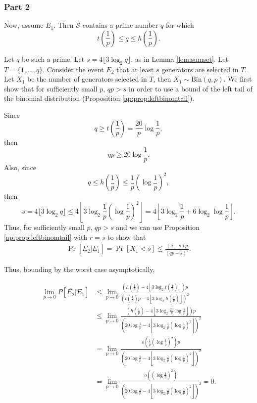 \subsubsection*{Part 2}

Now, assume $E_1$. Then $\mathcal{S}$ contains a prime number $q$ for which 
\[t\left(\frac{1}{p}\right) \leq q \leq h\left(\frac{1}{p}\right).\]
\par Let $q$ be such a prime. Let $s = 4\lfloor3\log_2 q \rfloor$, as in Lemma \ref{lem:sumset}. Let $T = \{1, \ldots,  q\}$. Consider the event $E_2$ that at least $s$ generators are selected in $T$. Let $X_1$ be the number of generators selected in $T$, then $X_1 \sim \mathrm{Bin}(q, p)$. We first show that for sufficiently small $p$, $qp > s$ in order to use a bound of the left tail of the binomial distribution (Proposition \ref{ap:prop:leftbinomtail}). \par
Since 
\[q \geq t\left(\frac{1}{p}\right) = \frac{20}{p}\log\frac{1}{p},\]
then 
\begin{equation*}
qp \geq 20\log\frac{1}{p}.
\end{equation*}
Also, since 
\[q \leq h\left(\frac{1}{p}\right) \leq \frac{1}{p}\left(\log\frac{1}{p}\right)^2,\]
then
\[s = 4\lfloor3\log_2 q \rfloor \leq 4\left\lfloor3\log_2 \frac{1}{p}\left(\log\frac{1}{p}\right)^2 \right\rfloor = 4\left\lfloor3\log_2 \frac{1}{p} + 6\log_2 \log\frac{1}{p} \right\rfloor.\]
Thus, for sufficiently small $p$, $qp> s$ and we can use Proposition \ref{ap:prop:leftbinomtail} with $r = s$ to show that
\begin{align*}
    \Pr[ \overline{E_2}  | E_1] = \Pr\left[X_1 < s\right] \leq \frac{(q - s)p}{(qp - s)^2}.
\end{align*}
\par Thus, bounding by the worst case asymptotically, 

\begin{align*}
    \lim_{p \to 0} P[\overline{E_2} | E_1] &\leq \lim_{p \to 0}\frac{\left(h\left(\frac{1}{p}\right) - 4\left\lfloor3\log_2 t\left(\frac{1}{p}\right) \right\rfloor\right)p}{\left(t\left(\frac{1}{p}\right)p - 4\left\lfloor3\log_2 h\left(\frac{1}{p}\right) \right\rfloor\right)^2} \\
    &\leq \lim_{p \to 0}\frac{\left(h\left(\frac{1}{p}\right) - 4\left\lfloor3\log_2 \frac{20}{p}\log\frac{1}{p} \right\rfloor\right)p}{\left(20\log\frac{1}{p} - 4\left\lfloor3\log_2 \frac{1}{p}\left(\log\frac{1}{p}\right)^2 \right\rfloor\right)^2}\\
    &=\lim_{p \to 0} \frac{o\left(\frac{1}{p}\left(\log\frac{1}{p}\right)^2\right)p}{\left(20\log\frac{1}{p} - 4\left\lfloor3\log_2 \frac{1}{p}\left(\log\frac{1}{p}\right)^2 \right\rfloor\right)^2}\\
    &=\lim_{p \to 0} \frac{o\left(\left(\log\frac{1}{p}\right)^2\right)}{\left(20\log\frac{1}{p} - 4\left\lfloor3\log_2 \frac{1}{p}\left(\log\frac{1}{p}\right)^2 \right\rfloor\right)^2} = 0.
\end{align*}

